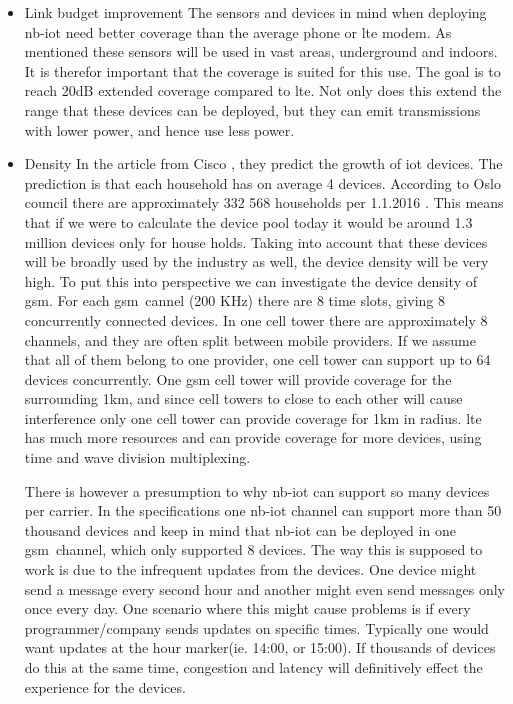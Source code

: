\documentclass[USenglish]{ifimaster}  %
\begin{document}
\begin{itemize}
  \item Link budget improvement \newline
  The sensors and devices in mind when deploying \acrshort{nb-iot} need better coverage than the average phone or \acrshort{lte} modem. As mentioned these sensors will be used in vast areas, underground and indoors. It is therefor important that the coverage is suited for this use. The goal is to reach 20dB extended coverage compared to \acrshort{lte}. Not only does this extend the range that these devices can be deployed, but they can emit transmissions with lower power, and hence use less power.

  \item Density \newline
  In the article from Cisco \cite{online:IoT2020}, they predict the growth of \acrshort{iot} devices. The prediction is that each household has on average 4 devices. According to Oslo council there are approximately 332 568 households per 1.1.2016 \cite{online:husholdningstatistikk}. This means that if we were to calculate the device pool today it would be around 1.3 million devices only for house holds. Taking into account that these devices will be broadly used by the industry as well, the device density will be very high. To put this into perspective we can investigate the device density of \acrshort{gsm}. For each \acrshort{gsm} cannel (200 KHz) there are 8 time slots, giving 8 concurrently connected devices. In one cell tower there are approximately 8 channels, and they are often split between mobile providers. If we assume that all of them belong to one provider, one cell tower can support up to 64 devices concurrently. One \acrshort{gsm} cell tower will provide coverage for the surrounding 1km, and since cell towers to close to each other will cause interference only one cell tower can provide coverage for 1km in radius. \acrshort{lte} has much more resources and can provide coverage for more devices, using time and wave division multiplexing.

  There is however a presumption to why \acrshort{nb-iot} can support so many devices per carrier. In the specifications one \acrshort{nb-iot} channel can support more than 50 thousand devices and keep in mind that \acrshort{nb-iot} can be deployed in one \acrshort{gsm} channel, which only supported 8 devices. The way this is supposed to work is due to the infrequent updates from the devices. One device might send a message every second hour and another might even send messages only once every day. One scenario where this might cause problems is if every programmer/company sends updates on specific times. Typically one would want updates at the hour marker(ie. 14:00, or 15:00). If thousands of devices do this at the same time, congestion and latency will definitively effect the experience for the devices.


\end{itemize}
\end{document}
